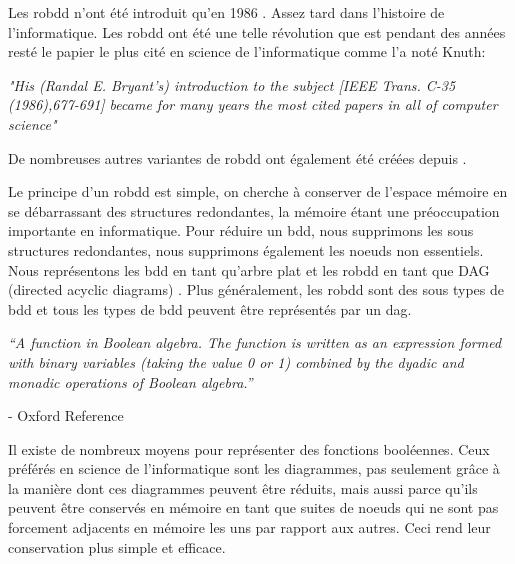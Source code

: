 \documentclass[french]{article}
\begin{document}
Les robdd n'ont été introduit qu'en 1986 \cite{bryant_graph}. Assez tard dans l'histoire de l'informatique. Les robdd ont été une telle révolution que \cite{bryant_graph} est pendant des années resté le papier le plus cité en science de l'informatique comme l'a noté Knuth:

\begin{center}
    \emph{"His (Randal E. Bryant's) introduction to the subject [IEEE Trans. C-35 (1986),677-691] became for many years the most cited papers in all of computer science"}\cite{knuth}
\end{center}

De nombreuses autres variantes de robdd ont également été créées depuis \cite{wegner}.\medskip

Le principe d'un robdd est simple, on cherche à conserver de l'espace mémoire en se débarrassant des structures redondantes, la mémoire étant une préoccupation importante en informatique. Pour réduire un bdd, nous supprimons les sous structures redondantes, nous supprimons également les noeuds non essentiels. Nous représentons les bdd en tant qu'arbre plat et les robdd en tant que DAG (directed acyclic diagrams) \cite{flajolet_automata}. Plus généralement, les robdd sont des sous types de bdd et tous les types de bdd peuvent être représentés par un dag.\medskip

\begin{center}
\emph{“A function in Boolean algebra. The function is written as an expression formed with binary variables (taking the value 0 or 1) combined by the dyadic and monadic operations of Boolean algebra.”} 
\end{center}

- Oxford Reference 
\vspace{5mm} 

Il existe de nombreux moyens pour représenter des fonctions booléennes. Ceux préférés en science de l'informatique sont les diagrammes, pas seulement grâce à la manière dont ces diagrammes peuvent être réduits, mais aussi parce qu'ils peuvent être conservés en mémoire en tant que suites de noeuds qui ne sont pas forcement adjacents en mémoire les uns par rapport aux autres. Ceci rend leur conservation plus simple et efficace.
\end{document}
